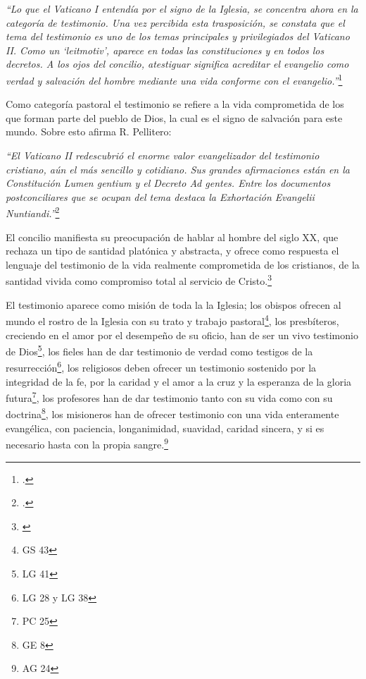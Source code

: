 \documentclass[11pt]{article}
\begin{document}
\emph{
``Lo que el Vaticano I entendía por el signo de la Iglesia, se concentra ahora en la categoría de testimonio. Una vez percibida esta trasposición, se constata que el tema del testimonio es uno de los temas principales y privilegiados del Vaticano II. Como un `leitmotiv', aparece en todas las constituciones y en todos los decretos. A los ojos del concilio, atestiguar significa acreditar el evangelio como verdad y salvación del hombre mediante una vida conforme con el evangelio.''}\footcite[1532]{dicctf}

Como categoría pastoral el testimonio se refiere a la vida comprometida de los que forman parte del pueblo de Dios, la cual es el signo de salvación para este mundo. Sobre esto afirma R. Pellitero:

\emph{
``El Vaticano II redescubrió el enorme valor evangelizador del testimonio cristiano, aún el más sencillo y cotidiano. Sus grandes afirmaciones están en la Constitución Lumen gentium y el Decreto Ad gentes. Entre los documentos postconciliares que se ocupan del tema destaca la Exhortación Evangelii Nuntiandi.''}\footcite[378--379]{ftcpellitero}

El concilio manifiesta su preocupación de hablar al hombre del siglo XX, que rechaza un tipo de santidad platónica y abstracta, y ofrece como respuesta el lenguaje del testimonio de la vida realmente comprometida de los cristianos, de la santidad vivida como compromiso total al servicio de Cristo.\footnote{\cite[1532 y 1533]{dicctf}} 

El testimonio aparece como misión de toda la la Iglesia; los obispos ofrecen al mundo el rostro de la Iglesia con su trato y trabajo pastoral\footnote{GS 43}, los presbíteros, creciendo en el amor por el desempeño de su oficio, han de ser un vivo testimonio de Dios\footnote{LG 41}, los fieles han de dar testimonio de verdad como testigos de la resurrección\footnote{LG 28 y LG 38}, los religiosos deben ofrecer un testimonio sostenido por la integridad de la fe, por la caridad y el amor a la cruz y la esperanza de la gloria futura\footnote{PC 25}, los profesores han de dar testimonio tanto con su vida como con su doctrina\footnote{GE 8}, los misioneros han de ofrecer testimonio con una vida enteramente evangélica, con paciencia, longanimidad, suavidad, caridad sincera, y si es necesario hasta con la propia sangre.\footnote{AG 24}
\end{document}
